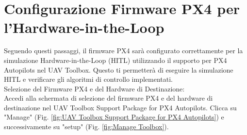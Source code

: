 \section{Configurazione Firmware PX4 per l'Hardware-in-the-Loop}
Seguendo questi passaggi, il firmware PX4 sarà configurato correttamente per la simulazione Hardware-in-the-Loop (HITL) utilizzando il supporto per PX4 Autopilots nel UAV Toolbox. Questo ti permetterà di eseguire la simulazione HITL e verificare gli algoritmi di controllo implementati.
\\
Selezione del Firmware PX4 e del Hardware di Destinazione:
\\
Accedi alla schermata di selezione del firmware PX4 e del hardware di destinazione nel UAV Toolbox Support Package for PX4 Autopilots. Clicca su "Manage" (Fig. \ref{fig:UAV Toolbox Support Package for PX4 Autopilots}) e successivamente su "setup" (Fig. \ref{fig:Manage Toolbox}).

